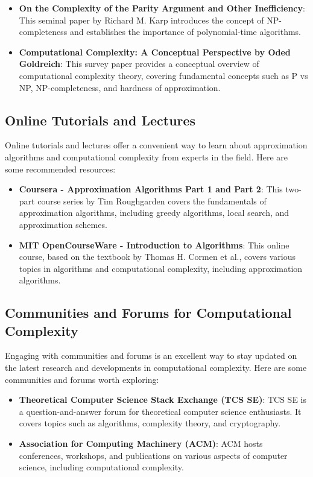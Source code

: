 \documentclass[12pt]{book} %
\begin{document}
\begin{itemize}
    \item \textbf{On the Complexity of the Parity Argument and Other Inefficiency}: This seminal paper by Richard M. Karp introduces the concept of NP-completeness and establishes the importance of polynomial-time algorithms.
    
    \item \textbf{Computational Complexity: A Conceptual Perspective by Oded Goldreich}: This survey paper provides a conceptual overview of computational complexity theory, covering fundamental concepts such as P vs NP, NP-completeness, and hardness of approximation.
\end{itemize}

\subsection{Online Tutorials and Lectures}
Online tutorials and lectures offer a convenient way to learn about approximation algorithms and computational complexity from experts in the field. Here are some recommended resources:

\begin{itemize}
    \item \textbf{Coursera - Approximation Algorithms Part 1 and Part 2}: This two-part course series by Tim Roughgarden covers the fundamentals of approximation algorithms, including greedy algorithms, local search, and approximation schemes.
    
    \item \textbf{MIT OpenCourseWare - Introduction to Algorithms}: This online course, based on the textbook by Thomas H. Cormen et al., covers various topics in algorithms and computational complexity, including approximation algorithms.
\end{itemize}

\subsection{Communities and Forums for Computational Complexity}
Engaging with communities and forums is an excellent way to stay updated on the latest research and developments in computational complexity. Here are some communities and forums worth exploring:

\begin{itemize}
    \item \textbf{Theoretical Computer Science Stack Exchange (TCS SE)}: TCS SE is a question-and-answer forum for theoretical computer science enthusiasts. It covers topics such as algorithms, complexity theory, and cryptography.
    
    \item \textbf{Association for Computing Machinery (ACM)}: ACM hosts conferences, workshops, and publications on various aspects of computer science, including computational complexity.
\end{itemize}
\end{document}
